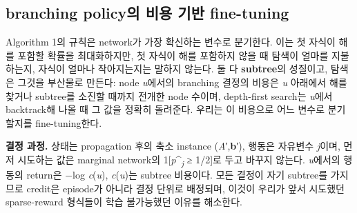 \documentclass[final,5p,twocolumn]{elsarticle}
\begin{document}
\noindent{}\par\medskip
\subsection{branching policy의 비용 기반 fine-tuning}
Algorithm 1의 규칙은 network가 가장 확신하는 변수로 분기한다. 이는 첫 자식이 해를 포함할 확률을 최대화하지만, 첫 자식이 해를 포함하지 않을 때 탐색이 얼마를 지불하는지, 자식이 얼마나 작아지는지는 말하지 않는다. 둘 다 \textbf{subtree}의 성질이고, 탐색은 그것을 부산물로 만든다: node \textit{u}에서의 branching 결정의 비용은 \textit{u} 아래에서 해를 찾거나 subtree를 소진할 때까지 전개한 node 수이며, depth-first search는 \textit{u}에서 backtrack해 나올 때 그 값을 정확히 돌려준다. 우리는 이 비용으로 어느 변수로 분기할지를 fine-tuning한다.

\textbf{결정 과정.} 상태는 propagation 후의 축소 instance (\textit{A}′,\textbf{b}′), 행동은 자유변수 \textit{j}이며, 먼저 시도하는 값은 marginal network의 1[\textit{p}\^{}\textsubscript{\textit{j}} ≥ 1/2]로 두고 바꾸지 않는다. \textit{u}에서의 행동의 return은 −log \textit{c}(\textit{u}), \textit{c}(\textit{u})는 subtree 비용이다. 모든 결정이 자기 subtree를 가지므로 credit은 episode가 아니라 결정 단위로 배정되며, 이것이 우리가 앞서 시도했던 sparse-reward 형식들이 학습 불가능했던 이유를 해소한다.
\end{document}
